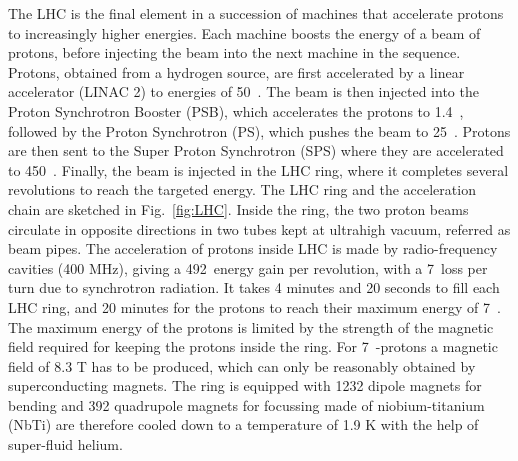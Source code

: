 The LHC is the final element in a succession of machines that accelerate protons to increasingly higher energies. Each machine boosts the energy of a beam of protons, before injecting the beam into the next machine in the sequence. 
Protons, obtained from a hydrogen source, are first accelerated by a linear accelerator (LINAC 2) to energies of 50~\MeV.
The beam is then injected into the Proton Synchrotron Booster (PSB), which accelerates the protons to 1.4~\GeV, followed by the Proton Synchrotron (PS), which pushes the beam to 25~\GeV. Protons are then sent to the Super Proton Synchrotron (SPS) where they are accelerated to 450~\GeV.
Finally, the beam is injected in the LHC ring, where it completes several revolutions to reach the targeted energy. The LHC ring and the acceleration chain are sketched in Fig.~\ref{fig:LHC}.
Inside the ring, the two proton beams circulate in opposite directions in two tubes kept at ultrahigh vacuum, referred as beam pipes.
The acceleration of protons inside LHC is made by radio-frequency cavities (400 MHz), giving a 492~\keV energy gain per revolution, with a 7~\keV loss per turn due to synchrotron radiation. It takes 4 minutes and 20 seconds to fill each LHC ring, and 20 minutes for the protons to reach their maximum energy of 7~\TeV. The maximum energy of the protons is limited by the strength of the magnetic field required for keeping the protons inside the ring. For 7~\TeV-protons a magnetic field of 8.3 T has to be produced, which can only be reasonably obtained by superconducting magnets. The ring is equipped with 1232 dipole magnets for bending and 392 quadrupole magnets for focussing made of niobium-titanium (NbTi) are therefore cooled down to a temperature of 1.9 K with the help of super-fluid helium.
